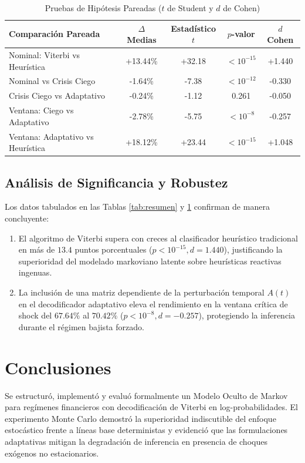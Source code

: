 \documentclass[conference,10pt,twocolumn]{IEEEtran}
\begin{document}
\begin{table}[htbp]
\caption{Pruebas de Hipótesis Pareadas ($t$ de Student y $d$ de Cohen)}
\label{tab:hipotesis}
\centering
\begin{tabular}{lcccc}
\toprule
\textbf{Comparación Pareada} & \textbf{$\Delta$ Medias} & \textbf{Estadístico $t$} & \textbf{$p$-valor} & \textbf{$d$ Cohen} \\
\midrule
Nominal: Viterbi vs Heurística & +13.44\% & +32.18 & $< 10^{-15}$ & +1.440 \\
Nominal vs Crisis Ciego & -1.64\% & -7.38 & $< 10^{-12}$ & -0.330 \\
Crisis Ciego vs Adaptativo & -0.24\% & -1.12 & 0.261 & -0.050 \\
Ventana: Ciego vs Adaptativo & -2.78\% & -5.75 & $< 10^{-8}$ & -0.257 \\
Ventana: Adaptativo vs Heurística & +18.12\% & +23.44 & $< 10^{-15}$ & +1.048 \\
\bottomrule
\end{tabular}
\end{table}

\subsection{Análisis de Significancia y Robustez}
Los datos tabulados en las Tablas \ref{tab:resumen} y \ref{tab:hipotesis} confirman de manera concluyente:
\begin{enumerate}
    \item El algoritmo de Viterbi supera con creces al clasificador heurístico tradicional en más de $13.4$ puntos porcentuales ($p < 10^{-15}, d = 1.440$), justificando la superioridad del modelado markoviano latente sobre heurísticas reactivas ingenuas.
    \item La inclusión de una matriz dependiente de la perturbación temporal $A(t)$ en el decodificador adaptativo eleva el rendimiento en la ventana crítica de shock del $67.64\%$ al $70.42\%$ ($p < 10^{-8}, d = -0.257$), protegiendo la inferencia durante el régimen bajista forzado.
\end{enumerate}

\section{Conclusiones}
Se estructuró, implementó y evaluó formalmente un Modelo Oculto de Markov para regímenes financieros con decodificación de Viterbi en log-probabilidades. El experimento Monte Carlo demostró la superioridad indiscutible del enfoque estocástico frente a líneas base deterministas y evidenció que las formulaciones adaptativas mitigan la degradación de inferencia en presencia de choques exógenos no estacionarios.
\end{document}
